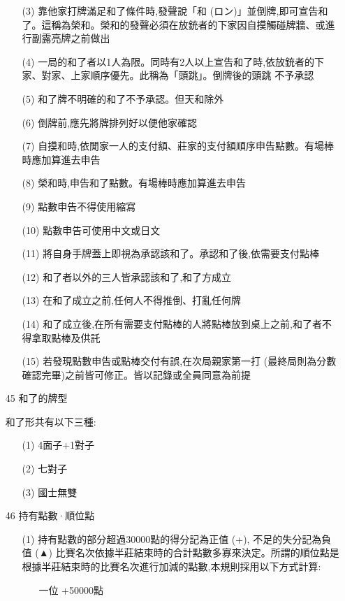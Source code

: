 \documentclass[a4paper,12pt]{article}
\begin{document}
\begin{itemize}
\begin{itemize}
        \item[(3)] 靠他家打牌滿足和了條件時,發聲說「和 (ロン)」並倒牌,即可宣告和了。這稱為榮和。榮和的發聲必須在放銃者的下家因自摸觸碰牌牆、或進行副露亮牌之前做出
        \item[(4)] 一局的和了者以1人為限。同時有2人以上宣告和了時,依放銃者的下家、對家、上家順序優先。此稱為「頭跳」。倒牌後的頭跳 不予承認
        \item[(5)] 和了牌不明確的和了不予承認。但天和除外
        \item[(6)] 倒牌前,應先將牌排列好以便他家確認
        \item[(7)] 自摸和時,依閒家一人的支付額、莊家的支付額順序申告點數。有場棒時應加算進去申告
        \item[(8)] 榮和時,申告和了點數。有場棒時應加算進去申告
        \item[(9)] 點數申告不得使用縮寫
        \item[(10)] 點數申告可使用中文或日文
        \item[(11)] 將自身手牌蓋上即視為承認該和了。承認和了後,依需要支付點棒
        \item[(12)] 和了者以外的三人皆承認該和了,和了方成立
        \item[(13)] 在和了成立之前,任何人不得推倒、打亂任何牌
        \item[(14)] 和了成立後,在所有需要支付點棒的人將點棒放到桌上之前,和了者不得拿取點棒及供託
        \item[(15)] 若發現點數申告或點棒交付有誤,在次局親家第一打 (最終局則為分數確認完畢)之前皆可修正。皆以記錄或全員同意為前提
    \end{itemize}
    \item[45] 和了的牌型
    \item[] 和了形共有以下三種:
    \begin{itemize}
        \item[(1)] 4面子+1對子
        \item[(2)] 七對子
        \item[(3)] 國士無雙
    \end{itemize}
    \item[46] 持有點數·順位點
    \begin{itemize}
        \item[(1)] 持有點數的部分超過30000點的得分記為正值 (+), 不足的失分記為負值 (▲) 比賽名次依據半莊結束時的合計點數多寡來決定。所謂的順位點是根據半莊結束時的比賽名次進行加減的點數,本規則採用以下方式計算:
        \begin{itemize}
            \item[一位] +50000點

\end{itemize}
\end{itemize}
\end{itemize}
\end{document}

